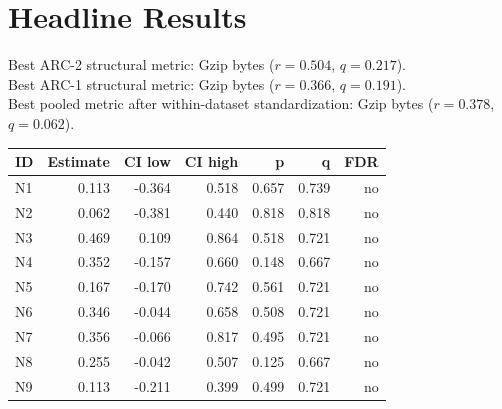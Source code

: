 \documentclass[11pt]{article}
\begin{document}
\section*{Headline Results}
Best ARC-2 structural metric: Gzip bytes ($r=0.504$, $q=0.217$).\\
Best ARC-1 structural metric: Gzip bytes ($r=0.366$, $q=0.191$).\\
Best pooled metric after within-dataset standardization: Gzip bytes ($r=0.378$, $q=0.062$).
\begin{center}
\small
\begin{tabular}{lrrrrrr}
\toprule
ID & Estimate & CI low & CI high & p & q & FDR \\
\midrule
N1 & 0.113 & -0.364 & 0.518 & 0.657 & 0.739 & no \\
N2 & 0.062 & -0.381 & 0.440 & 0.818 & 0.818 & no \\
N3 & 0.469 & 0.109 & 0.864 & 0.518 & 0.721 & no \\
N4 & 0.352 & -0.157 & 0.660 & 0.148 & 0.667 & no \\
N5 & 0.167 & -0.170 & 0.742 & 0.561 & 0.721 & no \\
N6 & 0.346 & -0.044 & 0.658 & 0.508 & 0.721 & no \\
N7 & 0.356 & -0.066 & 0.817 & 0.495 & 0.721 & no \\
N8 & 0.255 & -0.042 & 0.507 & 0.125 & 0.667 & no \\
N9 & 0.113 & -0.211 & 0.399 & 0.499 & 0.721 & no \\
\bottomrule
\end{tabular}
\end{center}
\end{document}
